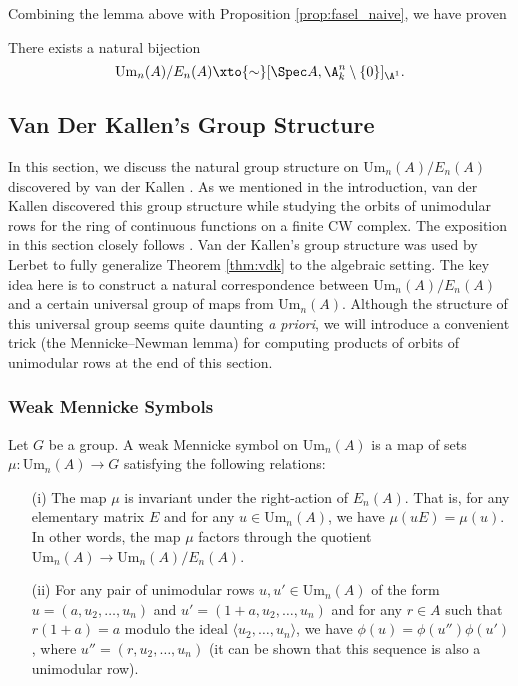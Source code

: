 Combining the lemma above with Proposition \ref{prop:fasel_naive}, we have proven

\begin{corollary}
    There exists a natural bijection \[\mathrm{Um}_n(A)/E_n(A) \xto{\sim} [\Spec A, \A^n_k\setminus \{0\}]_{\A^1}.\] 
\end{corollary}

\subsection{Van Der Kallen's Group Structure}\label{sec:group_structure}

In this section, we discuss the natural group structure on $\mathrm{Um}_n(A)/E_n(A)$ discovered by van der Kallen \cite{vdk}. As we mentioned in the introduction, van der Kallen discovered this group structure while studying the orbits of unimodular rows for the ring of continuous functions on a finite CW complex. The exposition in this section closely follows \cite[Section 3]{LERBET2024109415}. Van der Kallen's group structure was used by Lerbet to fully generalize Theorem \ref{thm:vdk} to the algebraic setting. The key idea here is to construct a natural correspondence between $\mathrm{Um}_n(A)/E_n(A)$ and a certain universal group of maps from $\mathrm{Um}_n(A)$. Although the structure of this universal group seems quite daunting \textit{a priori}, we will introduce a convenient trick (the Mennicke--Newman lemma) for computing products of orbits of unimodular rows at the end of this section.

\subsubsection{Weak Mennicke Symbols}

\begin{definition}\label{def:wms}
    Let $G$ be a group. A weak Mennicke symbol on $\mathrm{Um}_n(A)$ is a map of sets $\mu: \mathrm{Um}_n(A) \to G$ satisfying the following relations:
    \begin{itemize}
        \item[(i)] The map $\mu$ is invariant under the right-action of $E_n(A)$. That is, for any elementary matrix $E$ and for any $u \in \mathrm{Um}_n(A)$, we have $\mu(uE) = \mu(u)$. In other words, the map $\mu$ factors through the quotient $\mathrm{Um}_n(A) \to \mathrm{Um}_n(A)/E_n(A)$. 
        \item[(ii)] For any pair of unimodular rows $u,u' \in \mathrm{Um}_n(A)$ of the form $u = (a,u_2,\ldots,u_n)$ and $u' = (1+a,u_2,\ldots,u_n)$ and for any $r \in A$ such that $r(1 + a) = a$ modulo the ideal $\langle u_2,\ldots,u_n\rangle$, we have $\phi(u) = \phi(u'')\phi(u')$, where $u'' = (r,u_2,\ldots,u_n)$ (it can be shown that this sequence is also a unimodular row). 
    \end{itemize}
\end{definition}

